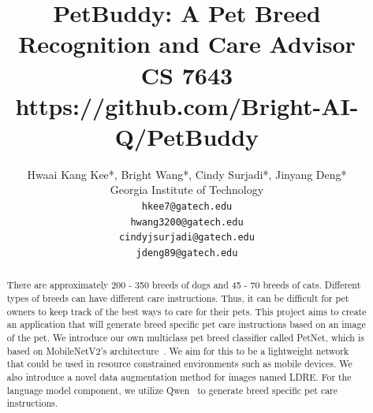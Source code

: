 \documentclass[10pt,twocolumn,letterpaper]{article}
\begin{document}
\title{PetBuddy: A Pet Breed Recognition and Care Advisor\\CS 7643\\https://github.com/Bright-AI-Q/PetBuddy}

\author{Hwaai Kang Kee*, Bright Wang*, Cindy Surjadi*, Jinyang Deng*\\
Georgia Institute of Technology\\
{\tt\small hkee7@gatech.edu}\\
{\tt\small hwang3200@gatech.edu}\\
{\tt\small cindyjsurjadi@gatech.edu}\\
{\tt\small jdeng89@gatech.edu}
}

\maketitle
\def\thefootnote{*}\def\thefootnote{\arabic{footnote}}

\begin{abstract}
   There are approximately 200 - 350 breeds of dogs and 45 - 70 breeds of cats. Different types of breeds can have different care instructions. Thus, it can be difficult for pet owners to keep track of the best ways to care for their pets. This project aims to create an application that will generate breed specific pet care instructions based on an image of the pet. We introduce our own multiclass pet breed classifier called PetNet, which is based on MobileNetV2's architecture~\cite{sandler2018mobilenetv2}. We aim for this to be a lightweight network that could be used in resource constrained environments such as mobile devices. We also introduce a novel data augmentation method for images named LDRE. For the language model component, we utilize Qwen~\cite{bai2023qwen} to generate breed specific pet care instructions.
\end{abstract}
\end{document}
